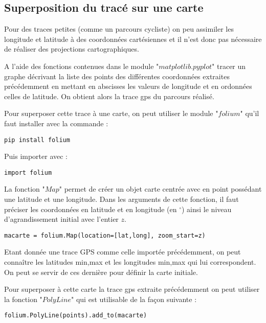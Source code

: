 \subsection*{Superposition du tracé sur une carte}

Pour des traces petites (comme un parcours cycliste) on peu assimiler les longitude et latitude à des coordonnées cartésiennes et il n'est donc pas nécessaire de réaliser des projections cartographiques.

\question{} A l'aide des fonctions contenues dans le module "$matplotlib.pyplot$" tracer un graphe décrivant la liste des points des différentes coordonnées extraites précédemment en mettant en abscisses les valeurs de longitude et en ordonnées celles de latitude. On obtient alors la trace gps du parcours réalisé.



Pour superposer cette trace à une carte, on peut utiliser le module "$folium$" qu'il faut installer avec la commande : 

\begin{lstlisting}
pip install folium
\end{lstlisting}

Puis importer avec :

\begin{lstlisting}
import folium
\end{lstlisting}

La fonction "$Map$" permet de créer un objet carte centrée avec en point possédant une latitude et une longitude. Dans les arguments de cette fonction, il faut préciser les coordonnées en latitude et en longitude (en $^{\circ}$) ainsi le niveau d'agrandissement initial avec l'entier $z$.

\begin{lstlisting}
macarte = folium.Map(location=[lat,long], zoom_start=z)
\end{lstlisting}

Etant donnée une trace GPS comme celle importée précédemment, on peut connaître les latitudes min,max et les longitudes min,max qui lui correspondent. On peut se servir de ces dernière pour définir la carte initiale.

Pour superposer à cette carte la trace gps extraite précédemment on peut utiliser la fonction "$PolyLine$" qui est utilisable de la façon suivante : 

\begin{lstlisting}
folium.PolyLine(points).add_to(macarte)
\end{lstlisting}

